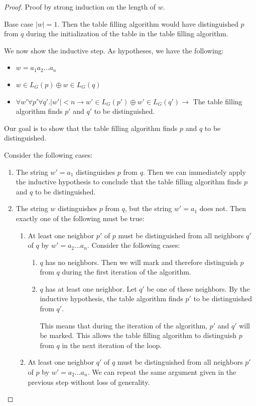\documentclass[12pt]{article}
\begin{document}
\begin{proof}
Proof by strong induction on the length of $w$.

Base case $|w|=1$. Then the table filling algorithm
would have distinguished $p$ from $q$ during the initialization of
the table in the table filling algorithm.

We now show the inductive step. As hypotheses, we have the following:

\begin{itemize}
    \item $w=a_1 a_2 ... a_n$
    \item $w \in L_G(p) \oplus w \in L_G(q)$
    \item $\forall w' \forall p' \forall q' . |w'| < n \rightarrow w' \in L_G(p') \oplus w' \in L_G(q') \rightarrow$ The table filling algorithm finds $p'$ and $q'$
    to be distinguished.
\end{itemize}

Our goal is to show that the table filling algorithm finds $p$ and $q$ to be distinguished.

Consider the following cases:

\begin{enumerate}
    \item The string $w'=a_1$ distinguishes $p$ from $q$. Then we can immediately apply the
    inductive hypothesis to conclude that the table filling algorithm finds $p$ and $q$
    to be distinguished.
    \item The string $w$ distinguishes $p$ from $q$, but the string $w'=a_1$ does not. Then exactly
    one of the following must be true:
    \begin{enumerate}
        \item At least one neighbor $p'$ of $p$ must be distinguished from all neighbors $q'$ of $q$ by $w'=a_2 ... a_n$.
        Consider the following cases:
        \begin{enumerate}
            \item $q$ has no neighbors. Then we will mark and therefore
            distinguish $p$ from $q$ during the first iteration of the algorithm.
            \item $q$ has at least one neighbor. Let $q'$ be one of these neighbors.
            By the inductive hypothesis, the table algorithm finds $p'$ to be
            distinguished from $q'$.
    
            This means that during the iteration of the algorithm, $p'$ and $q'$ will be marked. This allows
            the table filling algorithm to distinguish $p$ from $q$ in the next iteration of the loop.
        \end{enumerate}

        \item At least one neighbor $q'$ of $q$ must be distinguished from all neighbors $p'$ of $p$ by $w'=a_2 ... a_n$.
        We can repeat the same argument given in the previous step without loss of generality.
    \end{enumerate}
\end{enumerate}

\end{proof}
\end{document}
